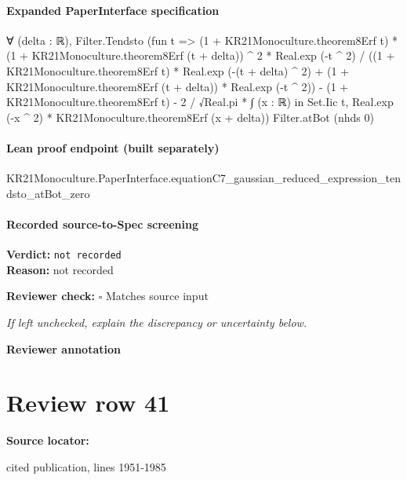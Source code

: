 \documentclass[10pt]{article}
\newcommand{\reviewerbox}{%
  \par\noindent\fbox{\parbox{0.96\linewidth}{\rule{0pt}{0.38in}}}\par
}
\newcommand{\reviewmatch}[1]{%
  \par\noindent\textbf{Reviewer check:} $\square$\; #1\par
  \noindent\emph{If left unchecked, explain the discrepancy or uncertainty below.}\par
}
\begin{document}
\paragraph{Expanded PaperInterface specification}
\begin{ReviewVerbatim}
∀ (delta : ℝ),
  Filter.Tendsto
    (fun t =>
      (1 + KR21Monoculture.theorem8Erf t) * (1 + KR21Monoculture.theorem8Erf (t + delta)) ^ 2 * Real.exp (-t ^ 2) /
            ((1 + KR21Monoculture.theorem8Erf t) * Real.exp (-(t + delta) ^ 2) +
              (1 + KR21Monoculture.theorem8Erf (t + delta)) * Real.exp (-t ^ 2)) -
          (1 + KR21Monoculture.theorem8Erf t) -
        2 / √Real.pi * ∫ (x : ℝ) in Set.Iic t, Real.exp (-x ^ 2) * KR21Monoculture.theorem8Erf (x + delta))
    Filter.atBot (nhds 0)
\end{ReviewVerbatim}

\paragraph{Lean proof endpoint (built separately)}\begin{ReviewVerbatim}
KR21Monoculture.PaperInterface.equationC7_gaussian_reduced_expression_tendsto_atBot_zero
\end{ReviewVerbatim}

\paragraph{Recorded source-to-Spec screening}
\textbf{Verdict:} \texttt{not recorded}
\\
\textbf{Reason:} not recorded
\reviewmatch{Matches source input}
\noindent\textbf{Reviewer annotation}\par
\reviewerbox
\clearpage
\hypertarget{source-claim-2c9d403cd319b538}{}
\section*{Review row 41}
\textbf{Source locator:} {\footnotesize\raggedright cited publication, lines 1951-\allowbreak{}1985\par}
\end{document}
